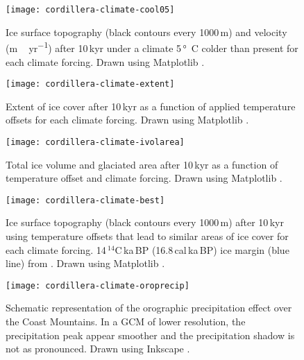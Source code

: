 \begin{figure*}[t]
	\vspace*{2mm}
	\begin{center}
		\texttt{[image: cordillera-climate-cool05]}
	\end{center}
	\caption{Ice surface topography (black contours every 1000\,m) and velocity (\unit{m\,yr^{-1}}) after 10\,kyr under a climate 5\,\unit{\degree C} colder than present for each climate forcing. Drawn using Matplotlib \citep{soft:mpl}.}
	\label{fig:cool05}
\end{figure*}

\begin{figure*}[t]
	\vspace*{2mm}
	\begin{center}
		\texttt{[image: cordillera-climate-extent]}
	\end{center}
	\caption{Extent of ice cover after 10\,kyr as a function of applied temperature offsets for each climate forcing. Drawn using Matplotlib \citep{soft:mpl}.}
	\label{fig:extent}
\end{figure*}

\begin{figure}[t]
	\vspace*{2mm}
	\begin{center}
		\texttt{[image: cordillera-climate-ivolarea]}
	\end{center}
	\caption{Total ice volume and glaciated area after 10\,kyr as a function of temperature offset and climate forcing. Drawn using Matplotlib \citep{soft:mpl}.}
	\label{fig:ivolarea}
\end{figure}

\begin{figure*}[t]
	\vspace*{2mm}
	\begin{center}
		\texttt{[image: cordillera-climate-best]}
	\end{center}
	\caption{Ice surface topography (black contours every 1000\,m) after 10\,kyr using temperature offsets that lead to similar areas of ice cover for each climate forcing. 14\,$^{14}$C\,ka\,BP (16.8\,cal\,ka\,BP) ice margin (blue line) from \citet{dyke-2004}. Drawn using Matplotlib \citep{soft:mpl}.}
	\label{fig:best}
\end{figure*}

\begin{figure}[t]
	\vspace*{2mm}
	\begin{center}
		\texttt{[image: cordillera-climate-oroprecip]}
	\end{center}
	\caption{Schematic representation of the orographic precipitation effect over the Coast Mountains. In a GCM of lower resolution, the precipitation peak appear smoother and the precipitation shadow is not as pronounced. Drawn using Inkscape \citep{web:inkscape}.}
	\label{fig:oroprecip}
\end{figure}
